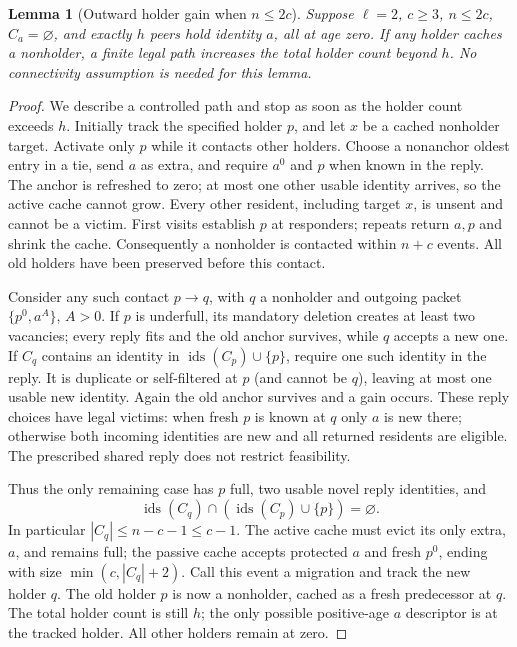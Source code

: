 \documentclass[11pt]{article}
\newtheorem{lemma}[theorem]{Lemma}
\begin{document}
\begin{lemma}[Outward holder gain when $n\le2c$]
\label{lem:halfdensegain}
Suppose $\ell=2$, $c\ge3$, $n\le2c$, $C_a=\varnothing$,
and exactly $h$ peers hold identity $a$, all at age zero.
If any holder caches a nonholder, a finite legal path
increases the total holder count beyond $h$.
No connectivity assumption is needed for this lemma.
\end{lemma}
\begin{proof}
We describe a controlled path and stop as soon as the
holder count exceeds $h$. Initially track the specified
holder $p$, and let $x$ be a cached nonholder target.
Activate only $p$ while it contacts other holders.
Choose a nonanchor oldest entry in a tie, send $a$ as
extra, and require $a^0$ and $p$ when known in the reply.
The anchor is refreshed to zero; at most one other usable
identity arrives, so the active cache cannot grow.
Every other resident, including target $x$, is unsent
and cannot be a victim. First visits establish $p$ at
responders; repeats return $a,p$ and shrink the cache.
Consequently a nonholder is contacted within $n+c$ events.
All old holders have been preserved before this contact.

Consider any such contact $p\to q$, with $q$ a nonholder
and outgoing packet $\{p^0,a^A\}$, $A>0$. If $p$ is
underfull, its mandatory deletion creates at least two
vacancies; every reply fits and the old anchor survives,
while $q$ accepts a new one. If $C_q$ contains an identity
in $\operatorname{ids}(C_p)\cup\{p\}$, require one such
identity in the reply. It is duplicate or self-filtered
at $p$ (and cannot be $q$), leaving at most one usable
new identity. Again the old anchor survives and a gain
occurs. These reply choices have legal victims: when
fresh $p$ is known at $q$ only $a$ is new there; otherwise
both incoming identities are new and all returned
residents are eligible. The prescribed shared reply
does not restrict feasibility.

Thus the only remaining case has $p$ full, two usable
novel reply identities, and
\[
 \operatorname{ids}(C_q)\cap
       (\operatorname{ids}(C_p)\cup\{p\})=\varnothing.
\]
In particular $|C_q|\le n-c-1\le c-1$.
The active cache must evict its only extra, $a$, and
remains full; the passive cache accepts protected $a$
and fresh $p^0$, ending with size $\min(c,|C_q|+2)$.
Call this event a migration and track the new holder $q$.
The old holder $p$ is now a nonholder, cached as a fresh
predecessor at $q$. The total holder count is still $h$;
the only possible positive-age $a$ descriptor is at the
tracked holder. All other holders remain at zero.


\end{proof}
\end{document}

